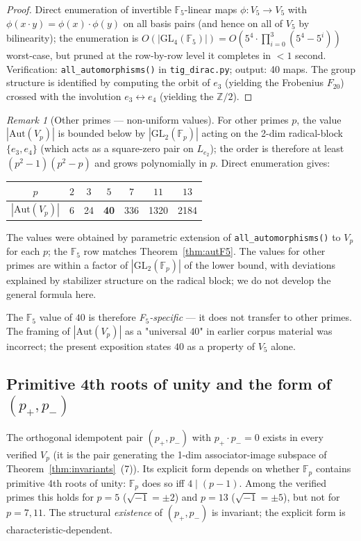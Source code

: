 \documentclass[11pt,reqno]{amsart}
\theoremstyle{plain}
\theoremstyle{definition}
\theoremstyle{remark}
\newtheorem*{remark}{Remark}
\newcommand{\Z}{\mathbb{Z}}
\newcommand{\F}{\mathbb{F}}
\newcommand{\Aut}{\mathrm{Aut}}
\newcommand{\GL}{\mathrm{GL}}
\begin{document}
\begin{proof}
Direct enumeration of invertible $\F_5$-linear maps
$\phi: V_5 \to V_5$ with $\phi(x \cdot y) = \phi(x) \cdot \phi(y)$ on
all basis pairs (and hence on all of $V_5$ by bilinearity); the
enumeration is $O(|\GL_4(\F_5)|) = O(5^4 \cdot \prod_{i=0}^3 (5^4 - 5^i))$
worst-case, but pruned at the row-by-row level it completes in $<1$
second. Verification: \texttt{all\_automorphisms()} in
\texttt{tig\_dirac.py}; output: 40 maps. The group structure is
identified by computing the orbit of $e_3$ (yielding the Frobenius
$F_{20}$) crossed with the involution $e_3 \leftrightarrow e_4$
(yielding the $\Z/2$).
\end{proof}

\begin{remark}[Other primes — non-uniform values]
For other primes $p$, the value $|\Aut(V_p)|$ is bounded below by
$|\GL_2(\F_p)|$ acting on the 2-dim radical-block
$\{e_3, e_4\}$ (which acts as a square-zero pair on $L_{e_2}$); the
order is therefore at least $(p^2 - 1)(p^2 - p)$ and grows
polynomially in $p$. Direct enumeration gives:
\begin{center}
\begin{tabular}{c|cccccc}
$p$ & $2$ & $3$ & $5$ & $7$ & $11$ & $13$\\\hline
$|\Aut(V_p)|$ & 6 & 24 & \textbf{40} & 336 & 1320 & 2184\\
\end{tabular}
\end{center}
The values were obtained by parametric extension of
\texttt{all\_automorphisms()} to $V_p$ for each $p$; the $\F_5$ row
matches Theorem~\ref{thm:autF5}. The values for other primes are
within a factor of $|\GL_2(\F_p)|$ of the lower bound, with deviations
explained by stabilizer structure on the radical block; we do not
develop the general formula here.

The $\F_5$ value of $40$ is therefore \emph{F$_5$-specific} — it does
not transfer to other primes. The framing of $|\Aut(V_p)|$ as a
"universal $40$" in earlier corpus material was incorrect; the present
exposition states $40$ as a property of $V_5$ alone.
\end{remark}

\subsection{Primitive 4th roots of unity and the form of $(p_+, p_-)$}

The orthogonal idempotent pair $(p_+, p_-)$ with $p_+ \cdot p_- = 0$
exists in every verified $V_p$ (it is the pair generating the 1-dim
associator-image subspace of Theorem~\ref{thm:invariants}~(7)). Its
explicit form depends on whether $\F_p$ contains primitive 4th roots
of unity: $\F_p$ does so iff $4 \mid (p - 1)$. Among the verified
primes this holds for $p = 5$ ($\sqrt{-1} = \pm 2$) and $p = 13$
($\sqrt{-1} = \pm 5$), but not for $p = 7, 11$. The structural
\emph{existence} of $(p_+, p_-)$ is invariant; the explicit form is
characteristic-dependent.
\end{document}
